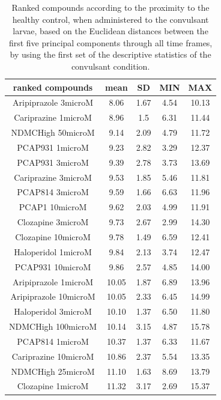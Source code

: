 \documentclass[a4paper,12pt]{article}
\begin{document}
\begin{table}[h!]\tiny
\centering
\caption{Ranked compounds according to the proximity to the healthy control, when administered to the convulsant larvae, based on the Euclidean distances between the first five principal components through all time frames, by using the first set of the descriptive statistics of the convulsant condition.}
\begin{tabular}{|c|c|c|c|c|}
\hline
ranked compounds             & mean & SD   & MIN  & MAX   \\ \hline
Aripiprazole 3microM  & 8.06  & 1.67 & 4.54  & 10.13 \\ \hline
Cariprazine 1microM   & 8.96  & 1.5  & 6.31  & 11.44 \\ \hline
NDMCHigh 50microM     & 9.14  & 2.09 & 4.79  & 11.72 \\ \hline
PCAP931 1microM       & 9.23  & 2.82 & 3.29  & 12.37 \\ \hline
PCAP931 3microM       & 9.39  & 2.78 & 3.73  & 13.69 \\ \hline
Cariprazine 3microM   & 9.53  & 1.85 & 5.46  & 11.81 \\ \hline
PCAP814 3microM       & 9.59  & 1.66 & 6.63  & 11.96 \\ \hline
PCAP1 10microM        & 9.62  & 2.03 & 4.99  & 11.91 \\ \hline
Clozapine 3microM     & 9.73  & 2.67 & 2.99  & 14.30  \\ \hline
Clozapine 10microM    & 9.78  & 1.49 & 6.59  & 12.41 \\ \hline
Haloperidol 1microM   & 9.84  & 2.13 & 3.74  & 12.47 \\ \hline
PCAP931 10microM      & 9.86  & 2.57 & 4.85  & 14.00    \\ \hline
Aripiprazole 1microM  & 10.05 & 1.87 & 6.89  & 13.96 \\ \hline
Aripiprazole 10microM & 10.05 & 2.33 & 6.45  & 14.99 \\ \hline
Haloperidol 3microM   & 10.10  & 1.37 & 6.50   & 11.80  \\ \hline
NDMCHigh 100microM    & 10.14 & 3.15 & 4.87  & 15.78 \\ \hline
PCAP814 1microM       & 10.37 & 1.37 & 6.33  & 11.67 \\ \hline
Cariprazine 10microM  & 10.86 & 2.37 & 5.54  & 13.35 \\ \hline
NDMCHigh 25microM     & 11.10  & 1.63 & 8.69  & 13.79 \\ \hline
Clozapine 1microM     & 11.32 & 3.17 & 2.69  & 15.37 \\ \hline

\end{tabular}
\end{table}
\end{document}
